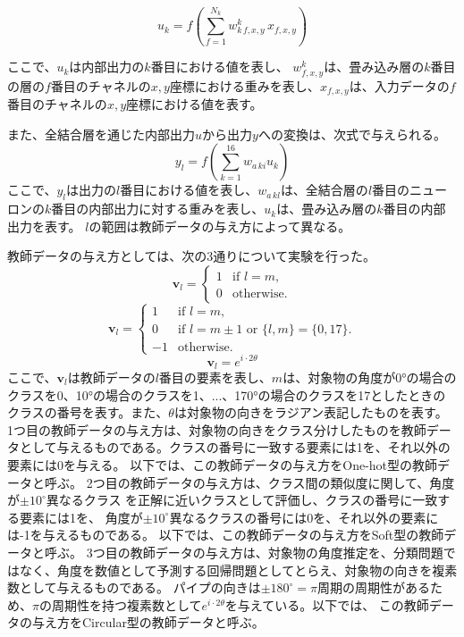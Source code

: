 \documentclass[11pt,a4paper,uplatex]{ujarticle}
\begin{document}
  \begin{equation}
    u_k = f\left(\sum_{f=1}^{N_k} w_{k\,f,x,y}^k\, x_{f,x,y}\right)
  \end{equation}

  ここで、$u_k$は内部出力の$k$番目における値を表し、
  $w_{f,x,y}^k$は、畳み込み層の$k$番目の層の$f$番目のチャネルの$x,y$座標における重みを表し、$x_{f,x,y}$は、入力データの$f$番目のチャネルの$x,y$座標における値を表す。

  また、全結合層を通じた内部出力$u$から出力$y$への変換は、次式で与えられる。
  \begin{equation}
    y_l = f\left(\sum_{k=1}^{16} w_{a\,ki} u_k\right)
  \end{equation}
  ここで、$y_l$は出力の$l$番目における値を表し、$w_{a\,kl}$は、全結合層の$l$番目のニューロンの$k$番目の内部出力に対する重みを表し、$u_k$は、畳み込み層の$k$番目の内部出力を表す。
  $l$の範囲は教師データの与え方によって異なる。

  教師データの与え方としては、次の3通りについて実験を行った。
  \begin{equation}\label{eq:onehot}
    \mathbf{v}_l =
    \begin{cases}
        1 & \text{if } l = m, \\
        0 & \text{otherwise}.
    \end{cases}
  \end{equation}
  \begin{equation}\label{eq:soft}
    \mathbf{v}_l =
    \begin{cases}
        1 & \text{if } l = m, \\
        0 & \text{if } l = m \pm 1 \text{ or } \{l, m\} = \{0, 17\}.\\
        -1 & \text{otherwise}.
    \end{cases}
  \end{equation}
  \begin{equation}\label{eq:circular}
    \mathbf{v}_l = e^{i\cdot2\theta}
  \end{equation}
  ここで、$\mathbf{v}_l$は教師データの$l$番目の要素を表し、$m$は、対象物の角度が0°の場合のクラスを0、10°の場合のクラスを1、...、170°の場合のクラスを17としたときの
  クラスの番号を表す。また、$\theta$は対象物の向きをラジアン表記したものを表す。
  1つ目の教師データの与え方は、対象物の向きをクラス分けしたものを教師データとして与えるものである。クラスの番号に一致する要素には1を、それ以外の要素には0を与える。
  以下では、この教師データの与え方をOne-hot型の教師データと呼ぶ。
  2つ目の教師データの与え方は、クラス間の類似度に関して、角度が$\pm10^{\circ}$異なるクラス
  を正解に近いクラスとして評価し、クラスの番号に一致する要素には1を、 角度が$\pm10^{\circ}$異なるクラスの番号には0を、それ以外の要素には-1を与えるものである。
  以下では、この教師データの与え方をSoft型の教師データと呼ぶ。
  3つ目の教師データの与え方は、対象物の角度推定を、分類問題ではなく、角度を数値として予測する回帰問題としてとらえ、対象物の向きを複素数として与えるものである。
  パイプの向きは$\pm180^{\circ} = \pi$周期の周期性があるため、$\pi$の周期性を持つ複素数として$e^{i\cdot2\theta}$を与えている。以下では、
  この教師データの与え方をCircular型の教師データと呼ぶ。
\end{document}
